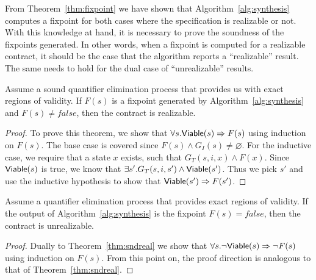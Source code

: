 From Theorem~\ref{thm:fixpoint} we have shown that Algorithm~\ref{alg:synthesis} computes a fixpoint for both cases where the specification is realizable or not. With this knowledge at hand, it is necessary to prove the soundness of the fixpoints generated. In other words, when a fixpoint is computed for a realizable contract, it should be the case that the algorithm reports a ``realizable'' result. The same needs to hold for the dual case of ``unrealizable'' results.

\begin{theorem}
\label{thm:sndreal}

Assume a sound quantifier elimination process that provides us with exact regions of validity. If $F(s)$ is a fixpoint generated by Algorithm~\ref{alg:synthesis} and $F(s) \neq false$, then the contract is realizable.
\end{theorem}
\begin{proof} To prove this theorem, we show that $\forall s. {\mathsf {Viable}}(s) \Rightarrow F(s)$ using induction on $F(s)$. The base case is covered since $F(s) \land G_I(s) \neq \varnothing$. For the inductive case, we require that a state $x$ exists, such that $G_T(s,i,x) \land F(x)$. Since ${\mathsf {Viable}}(s)$ is true, we know that $\exists s'. G_T(s,i,s') \land {\mathsf {Viable}}(s')$. Thus we pick $s'$ and use the inductive hypothesis to show that ${\mathsf {Viable}}(s') \Rightarrow F(s')$.
\end{proof}


\begin{theorem}
\label{thm:sndunreal}

Assume a quantifier elimination process that provides exact regions of validity. If the output of Algorithm~\ref{alg:synthesis} is the fixpoint $F(s) = false$, then the contract is unrealizable.
\end{theorem}
\begin{proof}
Dually to Theorem~\ref{thm:sndreal} we show that $\forall s. \lnot {\mathsf {Viable}}(s) \Rightarrow \lnot F(s)$ using induction on $F(s)$. From this point on, the proof direction is analogous to that of Theorem~\ref{thm:sndreal}.
\end{proof}


